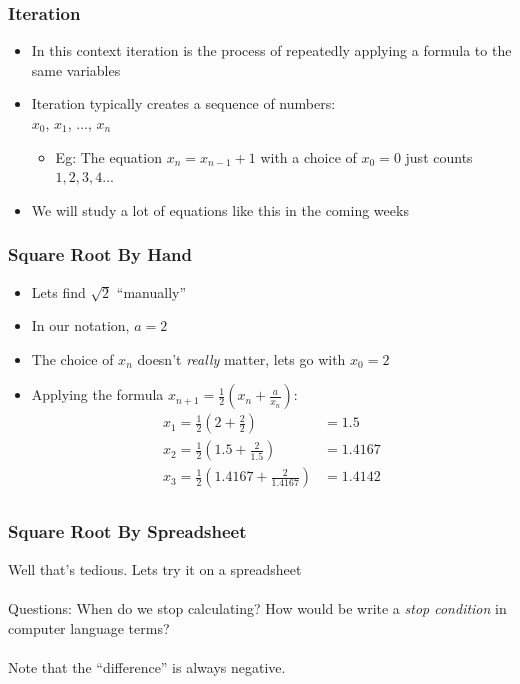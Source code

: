 \documentclass[14pt]{beamer}
\begin{document}
\begin{frame}[fragile]
\frametitle{Iteration}
\begin{itemize}
\item In this context iteration is the process of repeatedly applying a formula to the same variables
\item Iteration typically creates a sequence of numbers:\\$x_0$, $x_1$, ..., $x_n$
\begin{itemize}
\item Eg: The equation $x_n = x_{n-1} + 1$ with a choice of $x_0 = 0$ just counts $1,2,3,4...$
\end{itemize}
\item We will study a lot of equations like this in the coming weeks
\end{itemize}
\end{frame}

\begin{frame}
\frametitle{Square Root By Hand}
\begin{itemize}

\item Lets find $\sqrt{2}$ ``manually''
\item In our notation, $a=2$
\item The choice of $x_n$ doesn't \textit{really} matter, lets go with $x_0=2$
\item Applying the formula $x_{n+1} = \frac{1}{2}\left(x_n + \frac{a}{x_n}\right)$:
\footnotesize
\begin{align*}
x_1 = \frac{1}{2}\left( 2 + \frac{2}{2} \right) &= 1.5 \\
x_2 = \frac{1}{2}\left( 1.5 + \frac{2}{1.5} \right) &= 1.4167 \\
x_3 = \frac{1}{2}\left( 1.4167 + \frac{2}{1.4167} \right) &= 1.4142 \\
\end{align*}

\end{itemize}
\end{frame}

\begin{frame}
\frametitle{Square Root By Spreadsheet}
\begin{center}
Well that's tedious. Lets try it on a spreadsheet
~\\
~\\
Questions: When do we stop calculating? How would be write a \textit{stop condition} in computer language terms?\\
~\\
Note that the ``difference'' is always negative.
\end{center}
\end{frame}
\end{document}
